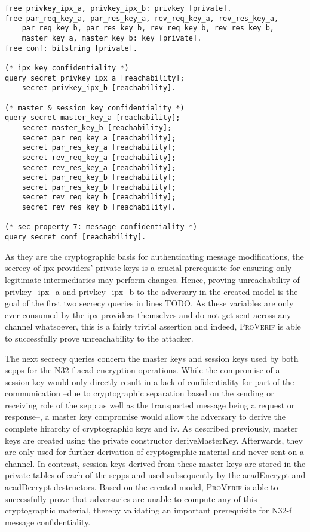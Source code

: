 \begin{lstlisting}[caption={Definition of custom one-way functions},label={lst:functions},firstnumber=221]
free privkey_ipx_a, privkey_ipx_b: privkey [private].
free par_req_key_a, par_res_key_a, rev_req_key_a, rev_res_key_a,
    par_req_key_b, par_res_key_b, rev_req_key_b, rev_res_key_b,
    master_key_a, master_key_b: key [private].
free conf: bitstring [private].

(* ipx key confidentiality *)
query secret privkey_ipx_a [reachability];
    secret privkey_ipx_b [reachability].

(* master & session key confidentiality *)
query secret master_key_a [reachability];
    secret master_key_b [reachability];
    secret par_req_key_a [reachability];
    secret par_res_key_a [reachability];
    secret rev_req_key_a [reachability];
    secret rev_res_key_a [reachability];
    secret par_req_key_b [reachability];
    secret par_res_key_b [reachability];
    secret rev_req_key_b [reachability];
    secret rev_res_key_b [reachability].

(* sec property 7: message confidentiality *)
query secret conf [reachability].
\end{lstlisting}

As they are the cryptographic basis for authenticating message modifications, the secrecy of \gls{ipx} providers' private keys is a crucial prerequisite for ensuring only legitimate intermediaries may perform changes.
Hence, proving unreachability of {\sffamily privkey\_ipx\_a} and {\sffamily privkey\_ipx\_b} to the adversary in the created model is the goal of the first two secrecy queries in lines TODO.
As these variables are only ever consumed by the \gls{ipx} providers themselves and do not get sent across any channel whatsoever, this is a fairly trivial assertion and indeed, \textsc{ProVerif} is able to successfully prove unreachability to the attacker.

The next secrecy queries concern the master keys and session keys used by both \glspl{sepp} for the N32-f \gls{aead} encryption operations.
While the compromise of a session key would only directly result in a lack of confidentiality for part of the communication --due to cryptographic separation based on the sending or receiving role of the \gls{sepp} as well as the transported message being a request or response--, a master key compromise would allow the adversary to derive the complete hirarchy of cryptographic keys and \gls{iv}.
As described previously, master keys are created using the private constructor {\sffamily deriveMasterKey}.
Afterwards, they are only used for further derivation of cryptographic material and never sent on a channel.
In contrast, session keys derived from these master keys are stored in the private tables of each of the \glspl{sepp} and used subsequently by the {\sffamily aeadEncrypt} and {\sffamily aeadDecrypt} destructors.
Based on the created model, \textsc{ProVerif} is able to successfully prove that adversaries are unable to compute any of this cryptographic material, thereby validating an important prerequisite for N32-f message confidentiality.

